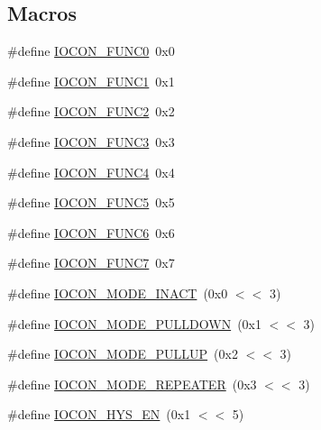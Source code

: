 \subsection*{Macros}
\begin{DoxyCompactItemize}
\item 
\#define \hyperlink{group__IOCON__17XX__40XX_gab08f72eae45dd5656aeca24c346c8626}{I\-O\-C\-O\-N\-\_\-\-F\-U\-N\-C0}~0x0
\item 
\#define \hyperlink{group__IOCON__17XX__40XX_gab6449233bd56957c684b9ad694606e3a}{I\-O\-C\-O\-N\-\_\-\-F\-U\-N\-C1}~0x1
\item 
\#define \hyperlink{group__IOCON__17XX__40XX_ga43ebb7abf055ce2491fbba5ef72f6fc7}{I\-O\-C\-O\-N\-\_\-\-F\-U\-N\-C2}~0x2
\item 
\#define \hyperlink{group__IOCON__17XX__40XX_gace4708e511b3aa9c352600604331bec0}{I\-O\-C\-O\-N\-\_\-\-F\-U\-N\-C3}~0x3
\item 
\#define \hyperlink{group__IOCON__17XX__40XX_gac621b96a2bd1ee57a83ff1af98287a8d}{I\-O\-C\-O\-N\-\_\-\-F\-U\-N\-C4}~0x4
\item 
\#define \hyperlink{group__IOCON__17XX__40XX_ga0f9630599f40a3f96a5887c7e65508a9}{I\-O\-C\-O\-N\-\_\-\-F\-U\-N\-C5}~0x5
\item 
\#define \hyperlink{group__IOCON__17XX__40XX_ga6284e27c6e5df6bc9f37c482e736a1d3}{I\-O\-C\-O\-N\-\_\-\-F\-U\-N\-C6}~0x6
\item 
\#define \hyperlink{group__IOCON__17XX__40XX_ga38efe875290e90d2f4185cb0ffe33e03}{I\-O\-C\-O\-N\-\_\-\-F\-U\-N\-C7}~0x7
\item 
\#define \hyperlink{group__IOCON__17XX__40XX_gafc593aafe607c88c52864ecb7586ffe9}{I\-O\-C\-O\-N\-\_\-\-M\-O\-D\-E\-\_\-\-I\-N\-A\-C\-T}~(0x0 $<$$<$ 3)
\item 
\#define \hyperlink{group__IOCON__17XX__40XX_ga270261df49234519bfd09e076dfcec6c}{I\-O\-C\-O\-N\-\_\-\-M\-O\-D\-E\-\_\-\-P\-U\-L\-L\-D\-O\-W\-N}~(0x1 $<$$<$ 3)
\item 
\#define \hyperlink{group__IOCON__17XX__40XX_gad8fe947d8e7076d6cec01a5b30261141}{I\-O\-C\-O\-N\-\_\-\-M\-O\-D\-E\-\_\-\-P\-U\-L\-L\-U\-P}~(0x2 $<$$<$ 3)
\item 
\#define \hyperlink{group__IOCON__17XX__40XX_ga53d705841cc362c6f43ffc1370d71726}{I\-O\-C\-O\-N\-\_\-\-M\-O\-D\-E\-\_\-\-R\-E\-P\-E\-A\-T\-E\-R}~(0x3 $<$$<$ 3)
\item 
\#define \hyperlink{group__IOCON__17XX__40XX_gafb7c408ac1f52b7b7e46fde3061fe0b7}{I\-O\-C\-O\-N\-\_\-\-H\-Y\-S\-\_\-\-E\-N}~(0x1 $<$$<$ 5)
\item 
$$
\end{DoxyCompactItemize}
